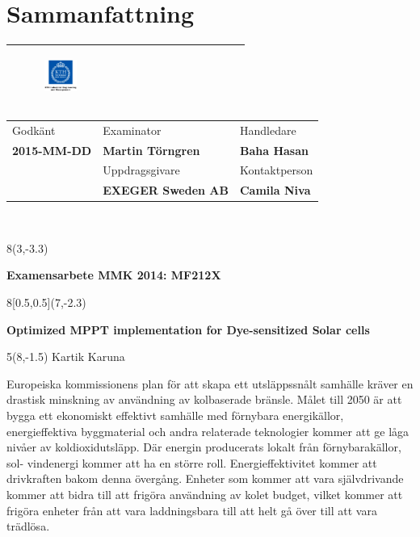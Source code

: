 \chapter*{Sammanfattning}
\thispagestyle{begin}

\begin{tabular}{ | p{\dimexpr \linewidth-2\tabcolsep} |} \hline
 \begin{figure}[H]
        
        \includegraphics[width=0.2\textwidth]{images/indust} 
             \end{figure}  \\\hline
\end{tabular}   
\begin{tabular}{ | p{} |
                  p{} |
                  p{} |} \hline
                 Godkänt & Examinator & Handledare \\
                  \textbf{2015-MM-DD}  & \textbf{Martin Törngren} & \textbf{Baha Hasan} \\\hline
                   & Uppdragsgivare & Kontaktperson \\
                   & \textbf{EXEGER Sweden AB} & \textbf{Camila Niva}\\ \hline
\end{tabular} \\
\begin{textblock}{8}(3,-3.3)
\begin{center}
\textbf{Examensarbete MMK 2014: MF212X }
\end{center}
\end{textblock}
\begin{textblock}{8}[0.5,0.5](7,-2.3)
\begin{center}
\textbf{Optimized MPPT implementation for Dye-sensitized Solar cells}
\end{center}
\end{textblock}
\begin{textblock}{5}(8,-1.5)
Kartik Karuna
\end{textblock}
Europeiska kommissionens plan för att skapa ett utsläppssnålt samhälle kräver en drastisk minskning av användning av kolbaserade bränsle. Målet till 2050 är att bygga ett ekonomiskt effektivt samhälle med förnybara energikällor, energieffektiva byggmaterial och andra relaterade teknologier kommer att ge låga nivåer av koldioxidutsläpp. Där energin producerats lokalt från förnybarakällor, sol- vindenergi kommer att ha en större roll. Energieffektivitet kommer att drivkraften bakom denna övergång. Enheter som kommer att vara självdrivande kommer att bidra till att frigöra användning av kolet budget, vilket kommer att frigöra enheter från att vara laddningsbara till att helt gå över till att vara trädlösa. 

